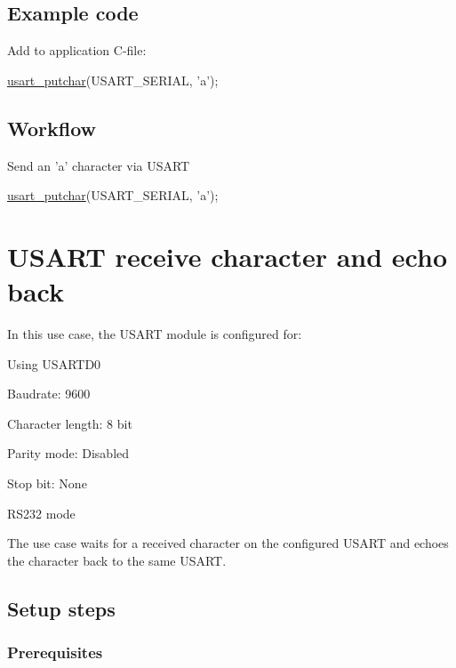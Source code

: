 \hypertarget{xmega_usart_quickstart_usart_basic_use_case_usage_code}{}\subsection{Example code}\label{xmega_usart_quickstart_usart_basic_use_case_usage_code}
Add to application C-\/file\-: 
\begin{DoxyCode}
        \hyperlink{group__usart__group_gaf3c57d5ee2bacfbc36338e64ca8107a6}{usart\_putchar}(USART\_SERIAL, \textcolor{charliteral}{'a'});
\end{DoxyCode}
\hypertarget{xmega_usart_quickstart_usart_basic_use_case_usage_flow}{}\subsection{Workflow}\label{xmega_usart_quickstart_usart_basic_use_case_usage_flow}

\begin{DoxyEnumerate}
\item Send an 'a' character via U\-S\-A\-R\-T
\begin{DoxyItemize}
\item 
\begin{DoxyCode}
 \hyperlink{group__usart__group_gaf3c57d5ee2bacfbc36338e64ca8107a6}{usart\_putchar}(USART\_SERIAL, \textcolor{charliteral}{'a'}); 
\end{DoxyCode}
 
\end{DoxyItemize}
\end{DoxyEnumerate}\hypertarget{usart_use_case_1}{}\section{U\-S\-A\-R\-T receive character and echo back}\label{usart_use_case_1}
In this use case, the U\-S\-A\-R\-T module is configured for\-:
\begin{DoxyItemize}
\item Using U\-S\-A\-R\-T\-D0
\item Baudrate\-: 9600
\item Character length\-: 8 bit
\item Parity mode\-: Disabled
\item Stop bit\-: None
\item R\-S232 mode
\end{DoxyItemize}

The use case waits for a received character on the configured U\-S\-A\-R\-T and echoes the character back to the same U\-S\-A\-R\-T.\hypertarget{usart_use_case_1_usart_use_case_1_setup}{}\subsection{Setup steps}\label{usart_use_case_1_usart_use_case_1_setup}
\hypertarget{usart_use_case_1_usart_use_case_1_setup_prereq}{}\subsubsection{Prerequisites}\label{usart_use_case_1_usart_use_case_1_setup_prereq}

